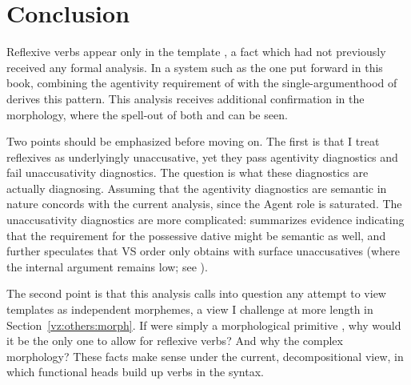 {{\section{Conclusion} \label{vz:conc}

Reflexive verbs appear only in the template {\thit}, a fact which had not previously received any formal analysis. In a system such as the one put forward in this book, combining the agentivity requirement of {\va} with the single-argumenthood of {\vz} derives this pattern. This analysis receives additional confirmation in the morphology, where the spell-out of both {\va} and {\vz} can be seen.

Two points should be emphasized before moving on. The first is that I treat reflexives as underlyingly unaccusative, yet they pass agentivity diagnostics and fail unaccusativity diagnostics. The question is what these diagnostics are actually diagnosing. Assuming that the agentivity diagnostics are semantic in nature concords with the current analysis, since the Agent role is saturated. The unaccusativity diagnostics are more complicated: \cite{kastner17gjgl} summarizes evidence indicating that the requirement for the possessive dative might be semantic as well, and further speculates that VS order only obtains with surface unaccusatives (where the internal argument remains low; see \citealt{unaccusativity95}).

The second point is that this analysis calls into question any attempt to view templates as independent morphemes, a view I challenge at more length in Section~\ref{vz:others:morph}. If {\thit} were simply a morphological primitive \citep{reinhartsiloni05}, why would it be the only one to allow for reflexive verbs? And why the complex morphology? These facts make sense under the current, decompositional view, in which functional heads build up verbs in the syntax.




}}
